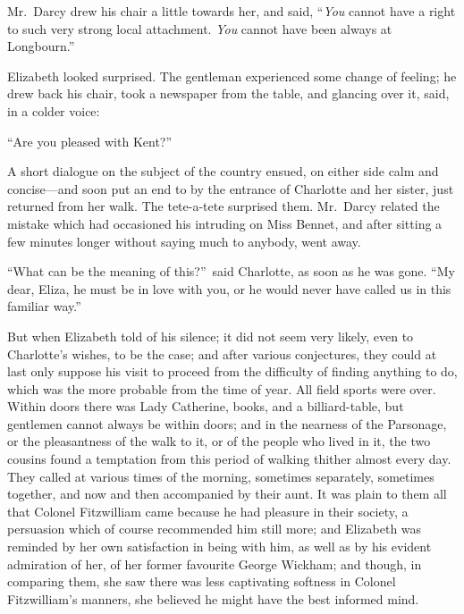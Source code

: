 \documentclass[12pt,english]{book}
\begin{document}
Mr.\ Darcy drew his chair a little towards her, and said, {}``\textit{You}
cannot have a right to such very strong local attachment. \textit{You}
cannot have been always at Longbourn.''

Elizabeth looked surprised. The gentleman experienced some change
of feeling; he drew back his chair, took a newspaper from the table,
and glancing over it, said, in a colder voice:

{}``Are you pleased with Kent?''\ 

A short dialogue on the subject of the country ensued, on either side
calm and concise\mbox{---}and soon put an end to by the entrance
of Charlotte and her sister, just returned from her walk. The tete-a-tete
surprised them. Mr.\ Darcy related the mistake which had occasioned
his intruding on Miss Bennet, and after sitting a few minutes longer
without saying much to anybody, went away.

{}``What can be the meaning of this?''\ said Charlotte, as soon
as he was gone. {}``My dear, Eliza, he must be in love with you,
or he would never have called us in this familiar way.''

But when Elizabeth told of his silence; it did not seem very likely,
even to Charlotte's wishes, to be the case; and after various conjectures,
they could at last only suppose his visit to proceed from the difficulty
of finding anything to do, which was the more probable from the time
of year. All field sports were over. Within doors there was Lady Catherine,
books, and a billiard-table, but gentlemen cannot always be within
doors; and in the nearness of the Parsonage, or the pleasantness of
the walk to it, or of the people who lived in it, the two cousins
found a temptation from this period of walking thither almost every
day. They called at various times of the morning, sometimes separately,
sometimes together, and now and then accompanied by their aunt. It
was plain to them all that Colonel Fitzwilliam came because he had
pleasure in their society, a persuasion which of course recommended
him still more; and Elizabeth was reminded by her own satisfaction
in being with him, as well as by his evident admiration of her, of
her former favourite George Wickham; and though, in comparing them,
she saw there was less captivating softness in Colonel Fitzwilliam's
manners, she believed he might have the best informed mind.
\end{document}
